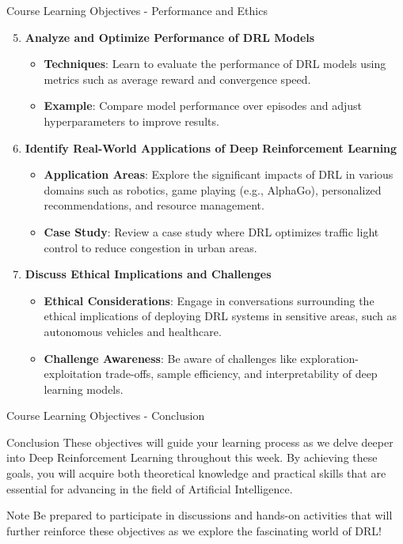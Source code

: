 \documentclass[aspectratio=169]{beamer}
\begin{document}
\begin{frame}[fragile]{Course Learning Objectives - Performance and Ethics}
    \begin{enumerate}
        \setcounter{enumi}{4}
        \item \textbf{Analyze and Optimize Performance of DRL Models}
            \begin{itemize}
                \item \textbf{Techniques}: Learn to evaluate the performance of DRL models using metrics such as average reward and convergence speed.
                \item \textbf{Example}: Compare model performance over episodes and adjust hyperparameters to improve results.
            \end{itemize}

        \item \textbf{Identify Real-World Applications of Deep Reinforcement Learning}
            \begin{itemize}
                \item \textbf{Application Areas}: Explore the significant impacts of DRL in various domains such as robotics, game playing (e.g., AlphaGo), personalized recommendations, and resource management.
                \item \textbf{Case Study}: Review a case study where DRL optimizes traffic light control to reduce congestion in urban areas.
            \end{itemize}

        \item \textbf{Discuss Ethical Implications and Challenges}
            \begin{itemize}
                \item \textbf{Ethical Considerations}: Engage in conversations surrounding the ethical implications of deploying DRL systems in sensitive areas, such as autonomous vehicles and healthcare.
                \item \textbf{Challenge Awareness}: Be aware of challenges like exploration-exploitation trade-offs, sample efficiency, and interpretability of deep learning models.
            \end{itemize}
    \end{enumerate}
\end{frame}

\begin{frame}[fragile]{Course Learning Objectives - Conclusion}
    \begin{block}{Conclusion}
        These objectives will guide your learning process as we delve deeper into Deep Reinforcement Learning throughout this week. By achieving these goals, you will acquire both theoretical knowledge and practical skills that are essential for advancing in the field of Artificial Intelligence.
    \end{block}
    
    \begin{block}{Note}
        Be prepared to participate in discussions and hands-on activities that will further reinforce these objectives as we explore the fascinating world of DRL!
    \end{block}
\end{frame}
\end{document}
